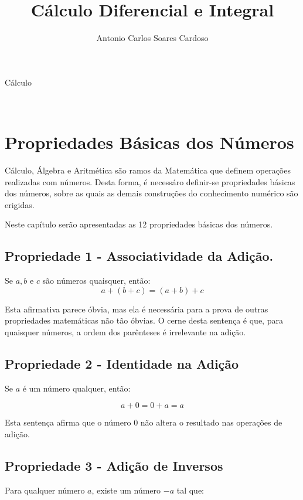 \documentclass[
    12pt, %
    openright,
    twoside, %
    a4paper, %
    article,
    english,brazil %
]{abntex2}
\author{Antonio Carlos Soares Cardoso}
\title{Cálculo Diferencial e Integral}
\makeatletter
\renewcommand\tableofcontents{%
  \null\hfill\textbf{\Large\contentsname}\hfill\null\par
  \@mkboth{\MakeUppercase\contentsname}{\MakeUppercase\contentsname}%
  \@starttoc{toc}%
}
\makeatother
\begin{document}
\begin{capa}
    \center
    \ABNTEXchapterfont\Large Cálculo\\
    \vspace*{1cm}
    {\ABNTEXchapterfont\large\imprimirautor}
    \vfill
    \begin{center}
    \ABNTEXchapterfont\bfseries\LARGE\imprimirtitulo
    \end{center}
    \vfill
    \large\imprimirlocal \\
    \large\imprimirdata
    \vspace*{1cm}
\end{capa}

\tableofcontents

\newpage

\textual

\section{Propriedades Básicas dos Números}

Cálculo, Álgebra e Aritmética são ramos da Matemática que definem operações realizadas com números. Desta forma, é necessáro definir-se propriedades básicas dos números, sobre as quais as demais construções do conhecimento numérico são erigidas.

Neste capítulo serão apresentadas as 12 propriedades básicas dos números.

\subsection{Propriedade 1 - Associatividade da Adição.}

Se $a,b$ e $c$ são números quaisquer, então: 
$$ a+(b+c)=(a+b)+c $$

Esta afirmativa parece óbvia, mas ela é necessária para a prova de outras propriedades matemáticas não tão óbvias. O cerne desta sentença é que, para quaisquer números, a ordem dos parênteses é irrelevante na adição. 

\subsection{Propriedade 2 - Identidade na Adição}
Se $a$ é um número qualquer, então: 

$$a+0=0+a=a$$

Esta sentença afirma que o número $0$ não altera o resultado nas operações de adição.

\subsection{Propriedade 3 - Adição de Inversos}
Para qualquer número $a$, existe um número $-a$ tal que: 
\end{document}
